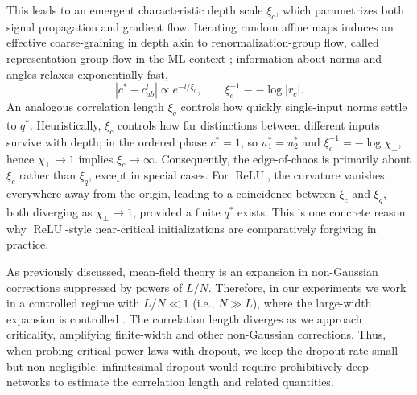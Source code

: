 \documentclass{article}
\DeclareMathOperator{\ReLU}{ReLU}
\newcommand{\relu}{\ensuremath{\ReLU}}
\theoremstyle{plain}
\theoremstyle{definition}
\theoremstyle{remark}
\begin{document}
 This leads to an emergent characteristic depth scale $\xi_c$, which parametrizes both signal propagation and gradient flow. Iterating random affine maps induces an effective coarse-graining in depth akin to renormalization-group flow, called representation group flow in the ML context \cite{roberts2022principlesdeeplearningtheory}; information about norms and angles relaxes exponentially fast,
\relax
\begin{equation}
|{c^*-c^l_{ab}}|\propto e^{-l/\xi_{c}}, \qquad \xi_{c}^{-1}\equiv -\log|r_{c}|.
\label{corrq}
\end{equation}
\relax
An analogous correlation length $\xi_q$ controls how quickly single-input norms settle to $q^{*}$. Heuristically, $\xi_{c}$ controls how far distinctions between different inputs survive with depth; in the ordered phase $c^{*}=1$, so $u_{1}^{*}=u_{2}^{*}$ and $\xi_{c}^{-1}=-\log\chi_{\perp}$, hence $\chi_{\perp}\to 1$ implies $\xi_{c}\to\infty$. Consequently, the edge-of-chaos is primarily about $\xi_{c}$ rather than $\xi_{q}$, except in special cases. For \relu{}, the curvature vanishes everywhere away from the origin, leading to a coincidence between $\xi_c$ and $\xi_q$, both diverging as $\chi_{\perp}\to 1$, provided a finite $q^{*}$ exists. This is one concrete reason why \relu{}-style near-critical initializations are comparatively forgiving in practice.

As previously discussed, mean-field theory is an expansion in non-Gaussian corrections suppressed by powers of \(L/N\). Therefore, in our experiments we work in a controlled regime with \(L/N \ll 1\) (i.e., \(N \gg L\)), where the large-width expansion is controlled \cite{roberts2022principlesdeeplearningtheory}. The correlation length diverges as we approach criticality, amplifying finite-width and other non-Gaussian corrections. Thus, when probing critical power laws with dropout, we keep the dropout rate small but non-negligible: infinitesimal dropout would require prohibitively deep networks to estimate the correlation length and related quantities.
\end{document}
